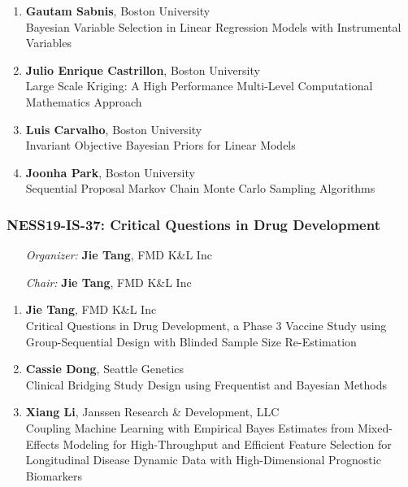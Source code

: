 \begin{enumerate}
\item \textbf{Gautam Sabnis}, Boston University \\
Bayesian Variable Selection in Linear Regression Models with Instrumental Variables
\item \textbf{Julio Enrique Castrillon}, Boston University \\
Large Scale Kriging: A High Performance Multi-Level Computational Mathematics Approach
\item \textbf{Luis Carvalho}, Boston University \\
Invariant Objective Bayesian Priors for Linear Models
\item \textbf{Joonha Park}, Boston University \\
Sequential Proposal Markov Chain Monte Carlo Sampling Algorithms
\end{enumerate}

\subsubsection*{NESS19-IS-37: Critical Questions in Drug Development}

\begin{enumerate}[align=left]
\item [\emph{Organizer:}] \textbf{Jie Tang}, FMD K\&L Inc \\
\item [\emph{Chair:}] \textbf{Jie Tang}, FMD K\&L Inc
\end{enumerate}

\begin{enumerate}
\item \textbf{Jie Tang}, FMD K\&L Inc \\
Critical Questions in Drug Development,   a Phase 3 Vaccine Study using Group-Sequential Design with Blinded Sample Size Re-Estimation
\item \textbf{Cassie Dong}, Seattle Genetics \\
Clinical Bridging Study Design using Frequentist and Bayesian Methods
\item \textbf{Xiang Li}, Janssen Research \& Development, LLC \\
Coupling Machine Learning with Empirical Bayes Estimates from Mixed-Effects Modeling for High-Throughput and Efficient Feature Selection for Longitudinal Disease Dynamic Data with High-Dimensional Prognostic Biomarkers
\end{enumerate}

